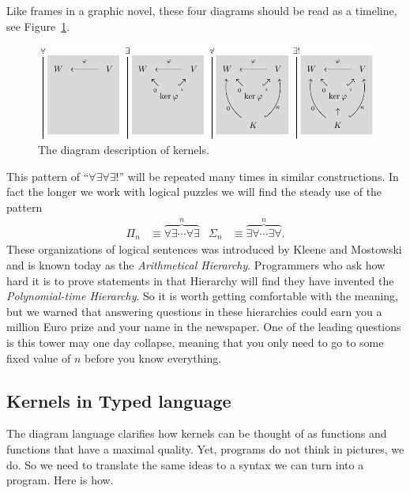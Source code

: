 \documentclass[12pt,twoside,dvipsnames,letterpaper]{memoir}
\begin{document}
Like frames in a graphic novel, these four diagrams should be read 
as a timeline, see Figure~\ref{fig:kernel-diag}.  
\begin{figure}[!htbp]
\begin{center}
    \includegraphics[width=\textwidth]{kernel-graphic.pdf}
\end{center}
\caption{The diagram description of kernels.}
\label{fig:kernel-diag}
\end{figure}

This pattern of 
``$\forall \exists\forall\exists!$'' will be repeated many times in similar 
constructions.  In fact the longer we work with logical puzzles we will 
find the steady use of the pattern 
\begin{align*}
    \Pi_n & \equiv \overbrace{\forall \exists\cdots \forall \exists}^n
    & 
    \Sigma_n & \equiv \overbrace{\exists\forall\cdots \exists\forall}^n.
\end{align*}
These organizations of logical sentences was introduced by Kleene and 
Mostowski and is known today as the \emph{Arithmetical Hierarchy}.
Programmers who ask how hard it is to prove statements in that Hierarchy 
will find they have invented the \emph{Polynomial-time Hierarchy}.
So it is worth getting comfortable with the meaning, but we warned 
that answering questions in these hierarchies could earn you a million Euro 
prize and your name in the newspaper.  One of the leading questions 
is this tower may one day collapse, meaning that you only need to go 
to some fixed value of $n$ before you know everything.

\subsection{Kernels in Typed language}

The diagram language clarifies how kernels can be thought of as functions and 
functions that have a maximal quality.  Yet, programs do not think in pictures, 
we do.  So we need to translate the same ideas to a syntax we can turn into a 
program.  Here is how.
\end{document}
